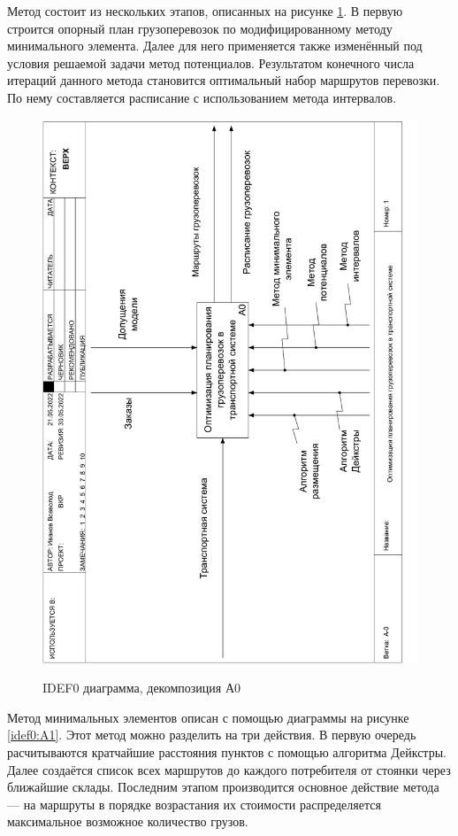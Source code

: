 Метод состоит из нескольких этапов, описанных на рисунке \ref{idef0:A0}. В первую строится опорный план грузоперевозок по модифицированному методу минимального элемента. Далее для него применяется также изменённый под условия решаемой задачи метод потенциалов. Результатом конечного числа итераций данного метода становится оптимальный набор маршрутов перевозки. По нему составляется расписание с использованием метода интервалов.

\begin{figure}[h]
	\begin{center}
		{\includegraphics[scale=0.63, angle=-90, page=2]{img/idef0/idef0.pdf}}
		\caption{IDEF0 диаграмма, декомпозиция А0}
		\label{idef0:A0}
	\end{center}
\end{figure}

Метод минимальных элементов описан с помощью диаграммы на рисунке \ref{idef0:A1}. Этот метод можно разделить на три действия. В первую очередь расчитываются кратчайшие расстояния пунктов с помощью алгоритма Дейкстры. Далее создаётся список всех маршрутов до каждого потребителя от стоянки через ближайшие склады. Последним этапом производится основное действие метода --- на маршруты в порядке возрастания их стоимости распределяется максимальное возможное количество грузов. 

